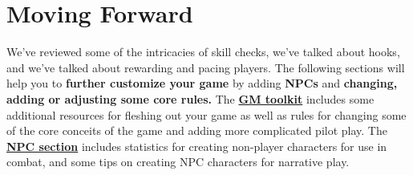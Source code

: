 \section{Moving Forward}

We’ve reviewed some of the intricacies of skill checks, we’ve talked about hooks, and we’ve
talked about rewarding and pacing players. The following sections will help you to \textbf{further
customize your game} by adding \textbf{NPCs} and \textbf{changing, adding or adjusting some core rules.}
The \hyperlink{GMToolkit}{\textbf{GM toolkit}} includes some additional resources for fleshing out your game as well as rules
for changing some of the core conceits of the game and adding more complicated pilot play. The
\hyperlink{NPCSection}{\textbf{NPC section}} includes statistics for creating non-player characters for use in combat, and some
tips on creating NPC characters for narrative play.

